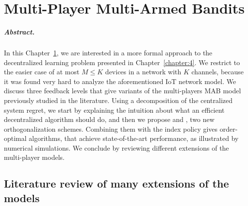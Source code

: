 
\chapter{Multi-Player Multi-Armed Bandits}
\label{chapter:5}

\graphicspath{{2-Chapters/5-Chapter/Images/}}
\graphicspath{{2-Chapters/5-Chapter/ALT_2018__MPBandits.git/figures/}}

\paragraph{Abstract.}
%
In this Chapter~\ref{chapter:5}, we are interested in a more formal approach to the decentralized learning problem presented in Chapter~\ref{chapter:4}.
We restrict to the easier case of at most $M \leq K$ devices in a network with $K$ channels, because it was found very hard to analyze the aforementioned IoT network model.
%
We discuss three feedback levels that give variants of the multi-players MAB model previously studied in the literature.
Using a decomposition of the centralized system regret, we start by explaining the intuition about what an efficient decentralized algorithm should do, and then we propose \RandTopM{} and \MCTopM, two new orthogonalization schemes.
Combining them with the \klUCB{} index policy gives order-optimal algorithms, that achieve state-of-the-art performance,
as illustrated by numerical simulations.
We conclude by reviewing different extensions of the multi-player models.




\minitoc


\newpage




\newpage  %
\section{Literature review of many extensions of the models}
\label{sec:5:literatureReviewOtherModels}

